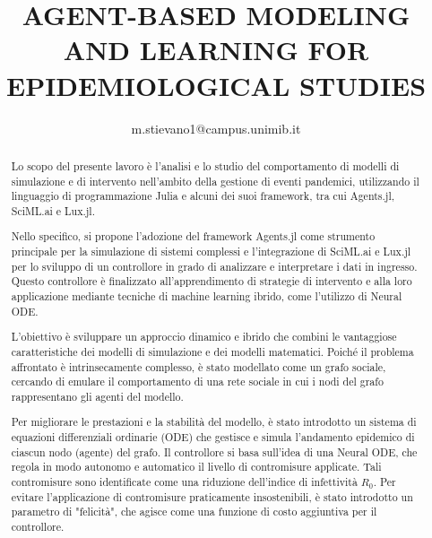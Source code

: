 \documentclass{article}
\title{AGENT-BASED MODELING AND LEARNING FOR EPIDEMIOLOGICAL STUDIES}
\author{m.stievano1@campus.unimib.it}
\begin{document}


\begin{abstract}
    Lo scopo del presente lavoro è l'analisi e lo studio del comportamento 
    di modelli di simulazione e di intervento nell'ambito della gestione 
    di eventi pandemici, utilizzando il linguaggio di programmazione Julia 
    e alcuni dei suoi framework, tra cui Agents.jl, SciML.ai e Lux.jl.

    Nello specifico, si propone l'adozione del framework Agents.jl come 
    strumento principale per la simulazione di sistemi complessi e 
    l'integrazione di SciML.ai e Lux.jl per lo sviluppo di un controllore 
    in grado di analizzare e interpretare i dati in ingresso. 
    Questo controllore è finalizzato all'apprendimento di strategie di 
    intervento e alla loro applicazione mediante tecniche di machine 
    learning ibrido, come l'utilizzo di Neural ODE.
    
    L'obiettivo è sviluppare un approccio dinamico e ibrido che combini 
    le vantaggiose caratteristiche dei modelli di simulazione e dei 
    modelli matematici. Poiché il problema affrontato è intrinsecamente 
    complesso, è stato modellato come un grafo sociale, 
    cercando di emulare il comportamento di una rete sociale in cui i 
    nodi del grafo rappresentano gli agenti del modello.
    
    Per migliorare le prestazioni e la stabilità del modello, è stato 
    introdotto un sistema di equazioni differenziali ordinarie (ODE) 
    che gestisce e simula l'andamento epidemico di ciascun nodo (agente) 
    del grafo. Il controllore si basa sull'idea di una Neural ODE, 
    che regola in modo autonomo e automatico il livello di contromisure 
    applicate. Tali contromisure sono identificate come una riduzione 
    dell'indice di infettività $R_0$. Per evitare l'applicazione di 
    contromisure praticamente insostenibili, è stato introdotto un 
    parametro di "felicità", che agisce come una funzione di costo 
    aggiuntiva per il controllore.
\end{abstract}


\tableofcontents
\newpage
\listoffigures
\listoftables
\newpage








\end{document}
